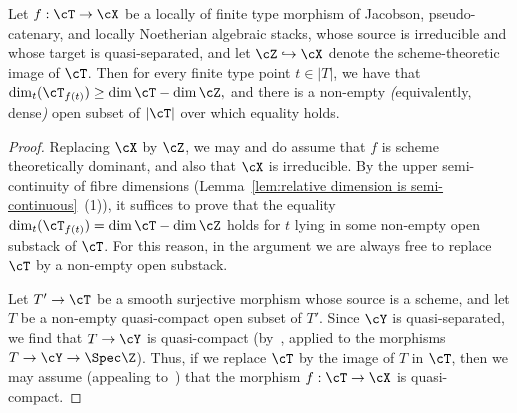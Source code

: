 \begin{alemma}
	\label{lem:dims of images}
	Let $f: \cT \to \cX$ be a locally of finite type
	morphism of Jacobson, pseudo-catenary, and locally Noetherian 
	algebraic stacks, 
	whose source is irreducible and whose target is quasi-separated,
	and let $\cZ \hookrightarrow \cX$ denote the scheme-theoretic
	image of $\cT$.
	Then for every finite type point $t \in |T|$, 
	we have that $\dim_t( \cT_{f(t)}) \geq \dim \cT  - \dim \cZ,$
	and there is a non-empty {\em (}equivalently, dense{\em )}
	open subset of $|\cT|$ over which equality holds.
	\end{alemma}
\begin{proof}
	Replacing $\cX$ by $\cZ$, we may and do assume that $f$ is scheme theoretically dominant,
	and also that $\cX$ is irreducible.
	By the upper semi-continuity of fibre dimensions
	(Lemma~\ref{lem:relative dimension is semi-continuous}~(1)),
	it suffices to prove that the equality $\dim_t( \cT_{f(t)}) =\dim \cT  - \dim \cZ$ holds for $t$ lying in
	some non-empty open substack of $\cT$.
	For this reason, in the argument we are always free 
	to replace $\cT$ by a non-empty open substack.

	Let $T' \to \cT$ be a smooth surjective morphism whose source
	is a scheme, and let $T$ be a non-empty quasi-compact open subset
	of $T'$.  Since $\cY$ is quasi-separated, we find 
	that $T \to  \cY$ is quasi-compact
          (by~\cite[\href{http://stacks.math.columbia.edu/tag/050Y}{Tag
            050Y}]{stacks-project}, applied to the morphisms
    $T \to \cY \to \Spec \Z$).
	Thus, if we replace $\cT$ by the image of $T$ in $\cT$,
	then we may assume (appealing 
          to~\cite[\href{http://stacks.math.columbia.edu/tag/050X}{Tag
            050X}]{stacks-project})
	that the morphism $f:\cT \to \cX$ is quasi-compact.


\end{proof}
